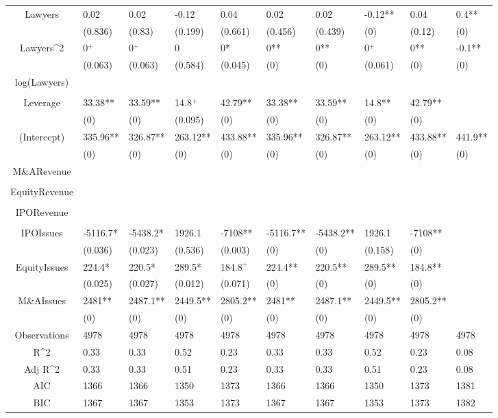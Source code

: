 \documentclass{article}
\begin{document}
\begin{table}[H]
\begin{tabular}{|clllllllll|}
Lawyers & 0.02 & 0.02 & -0.12 & 0.04 & 0.02 & 0.02 & -0.12** & 0.04 & 0.4** \\ 
   & (0.836) & (0.83) & (0.199) & (0.661) & (0.456) & (0.439) & (0) & (0.12) & (0) \\ 
  Lawyers^2 & 0$^{+}$ & 0$^{+}$ & 0 & 0* & 0** & 0** & 0$^{+}$ & 0** & -0.1** \\ 
   & (0.063) & (0.063) & (0.584) & (0.045) & (0) & (0) & (0.061) & (0) & (0) \\ 
  log(Lawyers) &  &  &  &  &  &  &  &  &  \\ 
   &  &  &  &  &  &  &  &  &  \\ 
  Leverage & 33.38** & 33.59** & 14.8$^{+}$ & 42.79** & 33.38** & 33.59** & 14.8** & 42.79** &  \\ 
   & (0) & (0) & (0.095) & (0) & (0) & (0) & (0) & (0) &  \\ 
  (Intercept) & 335.96** & 326.87** & 263.12** & 433.88** & 335.96** & 326.87** & 263.12** & 433.88** & 441.9** \\ 
   & (0) & (0) & (0) & (0) & (0) & (0) & (0) & (0) & (0) \\ 
  M\&ARevenue &  &  &  &  &  &  &  &  &  \\ 
   &  &  &  &  &  &  &  &  &  \\ 
  EquityRevenue &  &  &  &  &  &  &  &  &  \\ 
   &  &  &  &  &  &  &  &  &  \\ 
  IPORevenue &  &  &  &  &  &  &  &  &  \\ 
   &  &  &  &  &  &  &  &  &  \\ 
  IPOIssues & -5116.7* & -5438.2* & 1926.1 & -7108** & -5116.7** & -5438.2** & 1926.1 & -7108** &  \\ 
   & (0.036) & (0.023) & (0.536) & (0.003) & (0) & (0) & (0.158) & (0) &  \\ 
  EquityIssues & 224.4* & 220.5* & 289.5* & 184.8$^{+}$ & 224.4** & 220.5** & 289.5** & 184.8** &  \\ 
   & (0.025) & (0.027) & (0.012) & (0.071) & (0) & (0) & (0) & (0) &  \\ 
  M\&AIssues & 2481** & 2487.1** & 2449.5** & 2805.2** & 2481** & 2487.1** & 2449.5** & 2805.2** &  \\ 
   & (0) & (0) & (0) & (0) & (0) & (0) & (0) & (0) &  \\ 
  \hline 
 Observations & 4978 & 4978 & 4978 & 4978 & 4978 & 4978 & 4978 & 4978 & 4978 \\ 
  R^2 & 0.33 & 0.33 & 0.52 & 0.23 & 0.33 & 0.33 & 0.52 & 0.23 & 0.08 \\ 
  Adj R^2 & 0.33 & 0.33 & 0.51 & 0.23 & 0.33 & 0.33 & 0.51 & 0.23 & 0.08 \\ 
  AIC & 1366 & 1366 & 1350 & 1373 & 1366 & 1366 & 1350 & 1373 & 1381 \\ 
  BIC & 1367 & 1367 & 1353 & 1373 & 1367 & 1367 & 1353 & 1373 & 1382 \\ 
   \hline
\end{tabular}
 
\end{table}
\end{document}
